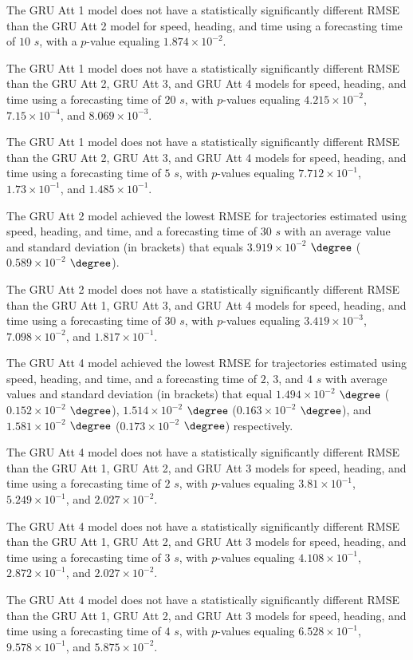 The GRU Att 1 model does not have a statistically significantly different RMSE than the GRU Att 2 model for speed, heading, and time using a forecasting time of $10$ $s$, with a $p$-value equaling $1.874 \times 10^{-2}$.

The GRU Att 1 model does not have a statistically significantly different RMSE than the GRU Att 2, GRU Att 3, and GRU Att 4 models for speed, heading, and time using a forecasting time of $20$ $s$, with $p$-values equaling $4.215 \times 10^{-2}$, $7.15 \times 10^{-4}$, and $8.069 \times 10^{-3}$.

The GRU Att 1 model does not have a statistically significantly different RMSE than the GRU Att 2, GRU Att 3, and GRU Att 4 models for speed, heading, and time using a forecasting time of $5$ $s$, with $p$-values equaling $7.712 \times 10^{-1}$, $1.73 \times 10^{-1}$, and $1.485 \times 10^{-1}$.

The GRU Att 2 model achieved the lowest RMSE for trajectories estimated using speed, heading, and time, and a forecasting time of $30$ $s$ with an average value and standard deviation (in brackets) that equals $3.919 \times 10^{-2}$ $\degree$ ($0.589 \times 10^{-2}$ $\degree$).

The GRU Att 2 model does not have a statistically significantly different RMSE than the GRU Att 1, GRU Att 3, and GRU Att 4 models for speed, heading, and time using a forecasting time of $30$ $s$, with $p$-values equaling $3.419 \times 10^{-3}$, $7.098 \times 10^{-2}$, and $1.817 \times 10^{-1}$.

The GRU Att 4 model achieved the lowest RMSE for trajectories estimated using speed, heading, and time, and a forecasting time of $2$, $3$, and $4$ $s$ with average values and standard deviation (in brackets) that equal $1.494 \times 10^{-2}$ $\degree$ ($0.152 \times 10^{-2}$ $\degree$), $1.514 \times 10^{-2}$ $\degree$ ($0.163 \times 10^{-2}$ $\degree$), and $1.581 \times 10^{-2}$ $\degree$ ($0.173 \times 10^{-2}$ $\degree$) respectively.

The GRU Att 4 model does not have a statistically significantly different RMSE than the GRU Att 1, GRU Att 2, and GRU Att 3 models for speed, heading, and time using a forecasting time of $2$ $s$, with $p$-values equaling $3.81 \times 10^{-1}$, $5.249 \times 10^{-1}$, and $2.027 \times 10^{-2}$.

The GRU Att 4 model does not have a statistically significantly different RMSE than the GRU Att 1, GRU Att 2, and GRU Att 3 models for speed, heading, and time using a forecasting time of $3$ $s$, with $p$-values equaling $4.108 \times 10^{-1}$, $2.872 \times 10^{-1}$, and $2.027 \times 10^{-2}$.

The GRU Att 4 model does not have a statistically significantly different RMSE than the GRU Att 1, GRU Att 2, and GRU Att 3 models for speed, heading, and time using a forecasting time of $4$ $s$, with $p$-values equaling $6.528 \times 10^{-1}$, $9.578 \times 10^{-1}$, and $5.875 \times 10^{-2}$.

